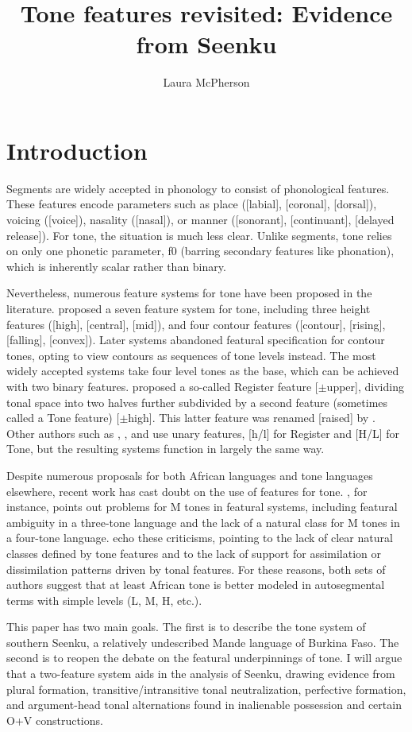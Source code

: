 \documentclass[output=paper]{langsci/langscibook}
\title{Tone features revisited: Evidence from Seenku}
\author{%
Laura McPherson \affiliation{Dartmouth College} 
}
\begin{document}
 \section{Introduction}
 
 Segments are widely accepted in phonology to consist of phonological features. These features encode parameters such as place ([labial], [coronal], [dorsal]), voicing ([voice]), nasality ([nasal]), or manner ([sonorant], [continuant], [delayed release]). For tone, the situation is much less clear. Unlike segments, tone relies on only one phonetic parameter, f0 (barring secondary features like phonation), which is inherently scalar rather than binary.
 
Nevertheless, numerous feature systems for tone have been proposed in the literature. \citet{Wang67} proposed a seven feature system for tone, including three height features ([high], [central], [mid]), and four contour features ([contour], [rising], [falling], [convex]). Later systems abandoned featural specification for contour tones, opting to view contours as sequences of tone levels instead. The most widely accepted systems take four level tones as the base, which can be achieved with two binary features. \citet{Yip80} proposed a so-called Register feature [$\pm$upper], dividing tonal space into two halves further subdivided by a second feature (sometimes called a Tone feature) [$\pm$high]. This latter feature was renamed [raised] by \citet{Pulleyblank86}. Other authors such as \citet{Clements83}, \citet{Snider90}, and \citet{Hyman93} use unary features, [h/l] for Register and [H/L] for Tone, but the resulting systems function in largely the same way.

Despite numerous proposals for both African languages and tone languages elsewhere, recent work has cast doubt on the use of features for tone. \citet{Hyman10b}, for instance, points out problems for M tones in featural systems, including featural ambiguity in a three-tone language and the lack of a natural class for M tones in a four-tone language. \citet{Clementsetal10} echo these criticisms, pointing to the lack of clear natural classes defined by tone features and to the lack of support for assimilation or dissimilation patterns driven by tonal features. For these reasons, both sets of authors suggest that at least African tone is better modeled in autosegmental terms with simple levels (L, M, H, etc.).

This paper has two main goals. The first is to describe the tone system of southern Seenku, a relatively undescribed Mande language of Burkina Faso. The second is to reopen the debate on the featural underpinnings of tone. I will argue that a two-feature system aids in the analysis of Seenku, drawing evidence from plural formation, transitive/intransitive tonal neutralization, perfective formation, and argument-head tonal alternations found in inalienable possession and certain O+V constructions.
\end{document}
